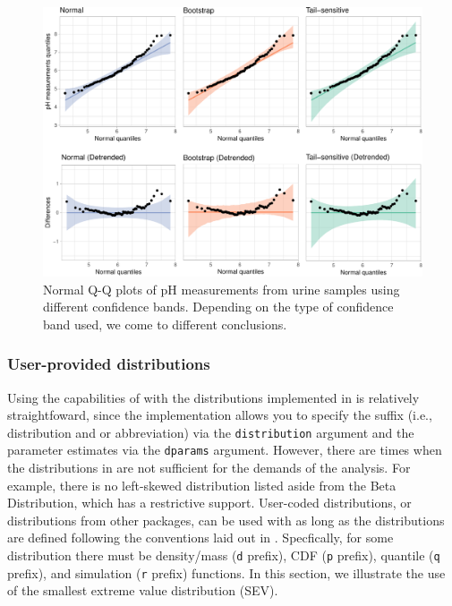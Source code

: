 \begin{Schunk}
\begin{figure}

{\centering \includegraphics[width=\textwidth]{loy-figures/urine-qq-bands-1} 

}

\caption[Normal Q-Q plots of pH measurements from urine samples using different confidence bands]{Normal Q-Q plots of pH measurements from urine samples using different confidence bands. Depending on the type of confidence band used, we come to different conclusions.}\label{fig:urine-qq-bands}
\end{figure}
\end{Schunk}

\FloatBarrier

\subsubsection{User-provided
distributions}\label{user-provided-distributions}

\label{sec:user-dists}

Using the capabilities of  with the distributions
implemented in  is relatively straightfoward, since the
implementation allows you to specify the suffix (i.e., distribution and
or abbreviation) via the \texttt{distribution} argument and the
parameter estimates via the \texttt{dparams} argument. However, there
are times when the distributions in  are not sufficient for
the demands of the analysis. For example, there is no left-skewed
distribution listed aside from the Beta Distribution, which has a
restrictive support. User-coded distributions, or distributions from
other packages, can be used with  as long as the
distributions are defined following the conventions laid out in
. Specfically, for some distribution there must be
density/mass (\texttt{d} prefix), CDF (\texttt{p} prefix), quantile
(\texttt{q} prefix), and simulation (\texttt{r} prefix) functions. In
this section, we illustrate the use of the smallest extreme value
distribution (SEV).

